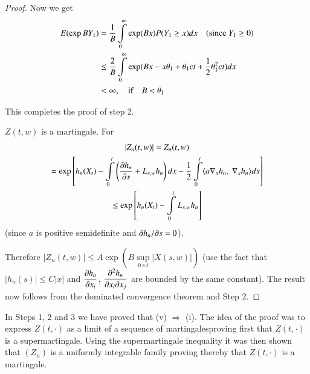 \begin{proof}
Now we get
\begin{align*}
E(\exp BY_{1}) &=
\frac{1}{B}\int\limits^{\infty}_{0}\exp(Bx)P(Y_{1}\geq
x)dx\quad(\text{since~ }Y_{1}\geq 0)\\
&\leq
\frac{2}{B}\int\limits^{\infty}_{0}\exp(Bx-x\theta_{1}+\theta_{1}ct+\frac{1}{2}\theta^{2}_{1}ct)dx\\
&<\infty,\quad\text{if}\quad B<\theta_{1}
\end{align*}

This completes the proof of step 2.

\begin{step}%
$Z(t,w)$ is a martingale. For
\begin{gather*}
|Z_{n}(t,w)|=Z_{n}(t,w)\\
=\exp\left[h_{n}(X_{t})-\int\limits^{t}_{0}\left(\frac{\partial h_{n}}{\partial
    s}+L_{s,w}h_{n}\right)dx-\frac{1}{2}\int\limits^{t}_{0}\langle 
a\nabla_{x}h_{n},\ \nabla_{x}h_{n}\rangle ds\right]\\
\leq \exp\left[h_{n}(X_{t})-\int\limits^{t}_{0}L_{s,w}h_{n}\right]
\end{gather*}
(since $a$ is positive semidefinite and $\partial h_{n}/\partial s=0$).
\end{step}

Therefore $|Z_{n}(t,w)|\leq A\exp(B\sup\limits_{0\ s\ t}|X(s,w)|)$
(use the fact that\break $|h_{n}(s)|\leq C|x|$ and $\dfrac{\partial h_{n}}{\partial
  x_{i}}$, $\dfrac{\partial^{2}h_{n}}{\partial x_{i}\partial x_{j}}$ are bounded by the
same constant). The result now follows from the dominated convergence
theorem and Step 2. 
\end{proof}

\begin{remark*}
In Steps 1, 2 and 3 we have proved that (v) $\Rightarrow$ (i). The
idea of the proof was to express $Z(t,\cdot)$ as a limit of a sequence
of martingales\pageoriginale proving first that $Z(t,\cdot)$ is a
supermartingale. Using the supermartingale inequality it was then
shown that $(Z_{n})$ is a uniformly integrable family proving thereby
that $Z(t,\cdot)$ is a martingale.
\end{remark*}

